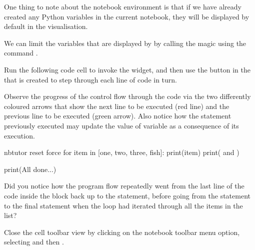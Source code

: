 \documentclass[letterpaper,10pt,english]{sphinxmanual}
\begin{document}
{One thing to note about the notebook environment is that if we have already created any Python variables in the current notebook, they will be displayed by default in the  visualisation.

We can limit the variables that are displayed by  by calling the magic using the command .

Run the following code cell to invoke the  widget, and then use the  button in the  that is created to step through each line of code in turn.

Observe the progress of the control flow through the code via the two differently coloured arrows that show the next line to be executed (red line) and the previous line to be executed (green arrow). Also notice how the statement previously executed may update the value of  variable as a consequence of its execution.

{
\begin{sphinxVerbatim}[commandchars=\\\{\}]
\llap{\color{nbsphinxin}[ ]:\,\hspace{\fboxrule}\hspace{\fboxsep}}\PYGZpc{}\PYGZpc{}nbtutor \PYGZhy{}\PYGZhy{}reset \PYGZhy{}\PYGZhy{}force
for item in [\PYGZsq{}one\PYGZsq{}, \PYGZsq{}two\PYGZsq{}, \PYGZsq{}three\PYGZsq{}, \PYGZsq{}fish\PYGZsq{}]:
    print(item)
    print(\PYGZsq{} and \PYGZsq{})

print(\PYGZsq{}All done...\PYGZsq{})
\end{sphinxVerbatim}
}

Did you notice how the program flow repeatedly went from the last line of the code inside the  block back up to the  statement, before going from the  statement to the final  statement when the loop had iterated through all the items in the list?

Close the  cell toolbar view by clicking on the notebook toolbar  menu option, selecting  and then .


}
\end{document}
